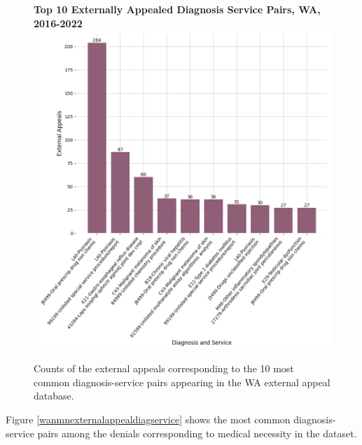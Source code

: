 \documentclass[12pt, a4paper,twoside]{report}
\theoremstyle{plain} %
\theoremstyle{definition} %
\theoremstyle{remark} %
\numberwithin{equation}{chapter}
\begin{document}
		\begin{figure}[h!]
			\centering
			\textbf{Top 10 Externally Appealed Diagnosis Service Pairs, WA, 2016-2022}
			\includegraphics[width=.8\textwidth]{images/wa_external_appeals/top_externally_appealed_diag_treatments.png}
			\caption{Counts of the external appeals corresponding to the 10 most common diagnosis-service pairs appearing in the WA external appeal database.}
			\label{waexternalappealsbydiagservice}
		\end{figure}
	
		Figure \ref{wanmnexternalappealdiagservice} shows the most common diagnosis-service pairs among the denials corresponding to medical necessity in the dataset.
		
\end{document}
